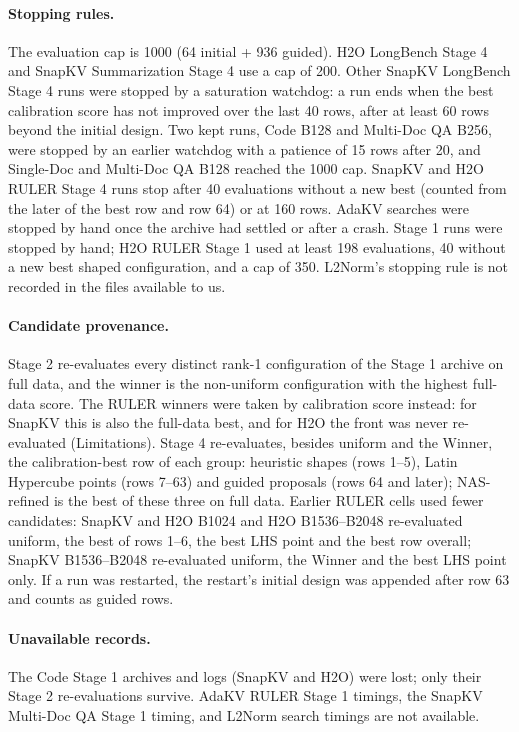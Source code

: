 \paragraph{Stopping rules.} The evaluation cap is 1000 (64 initial + 936 guided). H2O LongBench Stage 4 and SnapKV Summarization Stage 4 use a cap of 200. Other SnapKV LongBench Stage 4 runs were stopped by a saturation watchdog: a run ends when the best calibration score has not improved over the last 40 rows, after at least 60 rows beyond the initial design. Two kept runs, Code B128 and Multi-Doc QA B256, were stopped by an earlier watchdog with a patience of 15 rows after 20, and Single-Doc and Multi-Doc QA B128 reached the 1000 cap. SnapKV and H2O RULER Stage 4 runs stop after 40 evaluations without a new best (counted from the later of the best row and row 64) or at 160 rows. AdaKV searches were stopped by hand once the archive had settled or after a crash. Stage 1 runs were stopped by hand; H2O RULER Stage 1 used at least 198 evaluations, 40 without a new best shaped configuration, and a cap of 350. L2Norm's stopping rule is not recorded in the files available to us.

\paragraph{Candidate provenance.} Stage 2 re-evaluates every distinct rank-1 configuration of the Stage 1 archive on full data, and the winner is the non-uniform configuration with the highest full-data score. The RULER winners were taken by calibration score instead: for SnapKV this is also the full-data best, and for H2O the front was never re-evaluated (Limitations). Stage 4 re-evaluates, besides uniform and the Winner, the calibration-best row of each group: heuristic shapes (rows 1--5), Latin Hypercube points (rows 7--63) and guided proposals (rows 64 and later); NAS-refined is the best of these three on full data. Earlier RULER cells used fewer candidates: SnapKV and H2O B1024 and H2O B1536--B2048 re-evaluated uniform, the best of rows 1--6, the best LHS point and the best row overall; SnapKV B1536--B2048 re-evaluated uniform, the Winner and the best LHS point only. If a run was restarted, the restart's initial design was appended after row 63 and counts as guided rows.

\paragraph{Unavailable records.} The Code Stage 1 archives and logs (SnapKV and H2O) were lost; only their Stage 2 re-evaluations survive. AdaKV RULER Stage 1 timings, the SnapKV Multi-Doc QA Stage 1 timing, and L2Norm search timings are not available.

